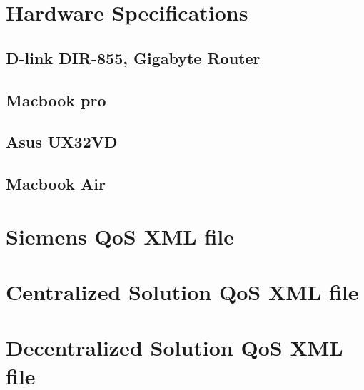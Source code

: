 
\chapter{Hardware Specifications}\label{appendix:HardwareSpecification}


\section{D-link DIR-855, Gigabyte Router}



\section{Macbook pro}\label{appendix:hardwareSpecification_pro}

\section{Asus UX32VD}\label{appendix:hardwareSpecification_asus}

\section{Macbook Air}\label{appendix:hardwareSpecification_air}


\chapter{Siemens QoS XML file}\label{appendix:siemensQosFile}


\chapter{Centralized Solution QoS XML file}\label{appendix:centralizedQosFile}


\chapter{Decentralized Solution QoS XML file}\label{appendix:decentralizedQosFile}